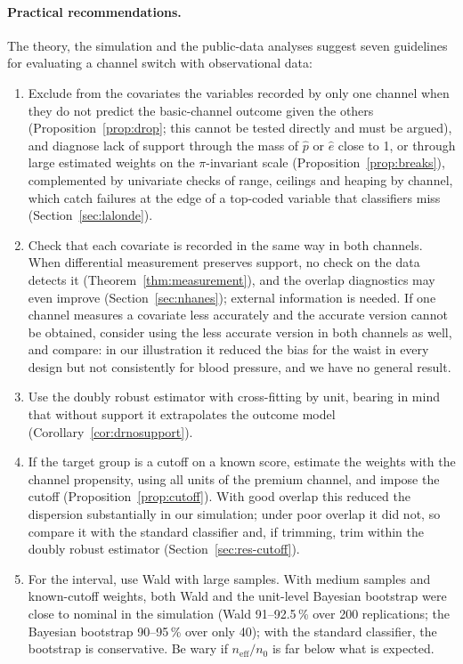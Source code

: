 \documentclass[11pt,a4paper]{article}
\newcommand{\neff}{n_{\mathrm{eff}}}
\theoremstyle{plain}
\theoremstyle{definition}
\begin{document}
\paragraph{Practical recommendations.} The theory, the simulation and the public-data analyses suggest seven guidelines for evaluating a channel switch with observational data:
\begin{enumerate}
  \item Exclude from the covariates the variables recorded by only one channel when they do not predict the basic-channel outcome given the others (Proposition~\ref{prop:drop}; this cannot be tested directly and must be argued), and diagnose lack of support through the mass of $\hat p$ or $\hat e$ close to 1, or through large estimated weights on the $\pi$-invariant scale (Proposition~\ref{prop:breaks}), complemented by univariate checks of range, ceilings and heaping by channel, which catch failures at the edge of a top-coded variable that classifiers miss (Section~\ref{sec:lalonde}).
  \item Check that each covariate is recorded in the same way in both channels. When differential measurement preserves support, no check on the data detects it (Theorem~\ref{thm:measurement}), and the overlap diagnostics may even improve (Section~\ref{sec:nhanes}); external information is needed. If one channel measures a covariate less accurately and the accurate version cannot be obtained, consider using the less accurate version in both channels as well, and compare: in our illustration it reduced the bias for the waist in every design but not consistently for blood pressure, and we have no general result.
  \item Use the doubly robust estimator with cross-fitting by unit, bearing in mind that without support it extrapolates the outcome model (Corollary~\ref{cor:drnosupport}).
  \item If the target group is a cutoff on a known score, estimate the weights with the channel propensity, using all units of the premium channel, and impose the cutoff (Proposition~\ref{prop:cutoff}). With good overlap this reduced the dispersion substantially in our simulation; under poor overlap it did not, so compare it with the standard classifier and, if trimming, trim within the doubly robust estimator (Section~\ref{sec:res-cutoff}).
  \item For the interval, use Wald with large samples. With medium samples and known-cutoff weights, both Wald and the unit-level Bayesian bootstrap were close to nominal in the simulation (Wald 91--92.5\,\% over 200 replications; the Bayesian bootstrap 90--95\,\% over only 40); with the standard classifier, the bootstrap is conservative. Be wary if $\neff/n_0$ is far below what is expected.

\end{enumerate}
\end{document}
